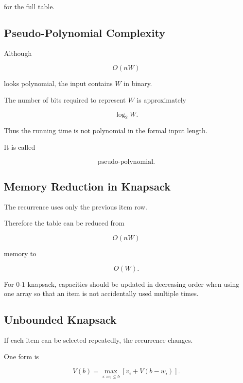 for the full table.

\subsection{Pseudo-Polynomial Complexity}
\label{subsec:dynamic-programming-pseudo-polynomial}

Although

\[
O(nW)
\]

looks polynomial, the input contains \(W\) in binary.

The number of bits required to represent \(W\) is approximately

\[
\log_2W.
\]

Thus the running time is not polynomial in the formal input length.

It is called

\[
\boxed{
\text{pseudo-polynomial}.
}
\]

\subsection{Memory Reduction in Knapsack}
\label{subsec:knapsack-memory-reduction}

The recurrence uses only the previous item row.

Therefore the table can be reduced from

\[
O(nW)
\]

memory to

\[
\boxed{
O(W).
}
\]

For \(0\)-\(1\) knapsack, capacities should be updated in decreasing order
when using one array so that an item is not accidentally used multiple
times.

\subsection{Unbounded Knapsack}
\label{subsec:unbounded-knapsack-dp}

If each item can be selected repeatedly, the recurrence changes.

One form is

\[
\boxed{
V(b)
=
\max_{i:w_i\leq b}
\left[
v_i+V(b-w_i)
\right].
}
\]

